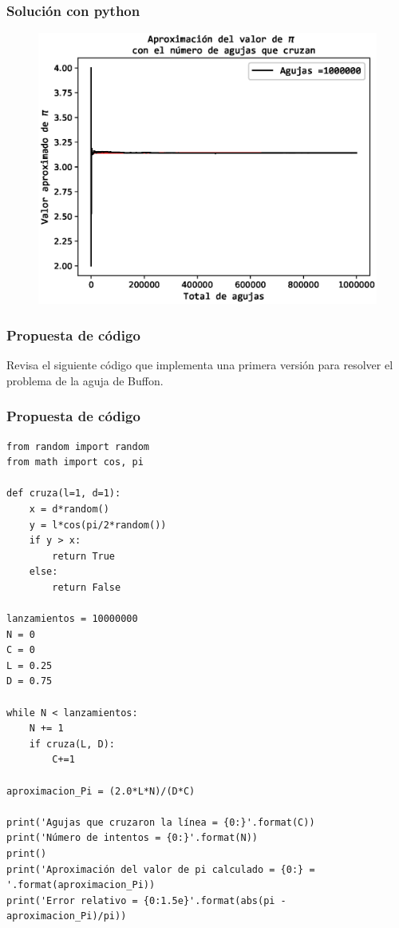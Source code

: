 \documentclass[12pt]{beamer}
\begin{document}
\begin{frame}
\frametitle{Solución con python}
\begin{figure}
  \centering
  \includegraphics[scale=0.6]{Imagenes/aproximacionPi_1000000.eps}
\end{figure}
\end{frame}
\begin{frame}
\frametitle{Propuesta de código}
Revisa el siguiente código que implementa una primera versión para resolver el problema de la aguja de Buffon.
\end{frame}
\begin{frame}
\frametitle{Propuesta de código}
\begin{lstlisting}[caption=Primera propuesta para el problema de la aguja de Buffon, basicstyle=\linespread{1.1}\ttfamily=\small, columns=fullflexible]
from random import random
from math import cos, pi

def cruza(l=1, d=1):
    x = d*random()
    y = l*cos(pi/2*random())
    if y > x:
        return True
    else:
        return False

lanzamientos = 10000000
N = 0
C = 0
L = 0.25
D = 0.75
  
while N < lanzamientos:
    N += 1
    if cruza(L, D):
        C+=1

aproximacion_Pi = (2.0*L*N)/(D*C)

print('Agujas que cruzaron la línea = {0:}'.format(C))
print('Número de intentos = {0:}'.format(N))
print()
print('Aproximación del valor de pi calculado = {0:} = '.format(aproximacion_Pi))
print('Error relativo = {0:1.5e}'.format(abs(pi - aproximacion_Pi)/pi))
\end{lstlisting}
\end{frame}
\end{document}
